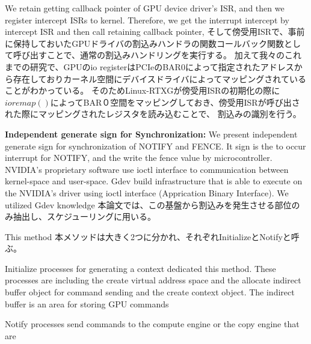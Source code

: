 We retain getting callback pointer of GPU device driver's ISR, and then we register intercept ISRs to kernel.
Therefore, we get the interrupt intercept by intercept ISR and then call retaining callback pointer, 
そして傍受用ISRで、事前に保持しておいたGPUドライバの割込みハンドラの関数コールバック関数として呼び出すことで、通常の割込みハンドリングを実行する。
加えて我々のこれまでの研究\cite{fujii:icpads2013,kato2013zero}で、GPUのio registerはPCIeのBAR0によって指定されたアドレスから存在しておりカーネル空間にデバイスドライバによってマッピングされていることがわかっている。
そのためLinux-RTXGが傍受用ISRの初期化の際に$ioremap()$によってBAR０空間をマッピングしておき、傍受用ISRが呼び出された際にマッピングされたレジスタを読み込むことで、
割込みの識別を行う。


\textbf{Independent generate sign for Synchronization:}
We present independent generate sign for synchronization of NOTIFY and FENCE.
It sign is the to occur interrupt for NOTIFY, and the write the fence value by microcontroller.
NVIDIA's proprietary software use ioctl interface to communication between kernel-space and user-space.
Gdev build infrastructure that is able to execute on the NVIDIA's driver using ioctl interface (Apprication Binary Interface).
We   utilized Gdev knowledge
本論文では、この基盤から割込みを発生させる部位のみ抽出し、スケジューリングに用いる。

This method 
本メソッドは大きく2つに分かれ、それぞれInitializeとNotifyと呼ぶ。

Initialize processes for generating a context dedicated this method.
These processes are including the create virtual address space and the allocate indirect buffer object for command sending and the create context object.
The indirect buffer is an area for storing GPU commands

Notify processes send commands to the compute engine or the copy engine that are


